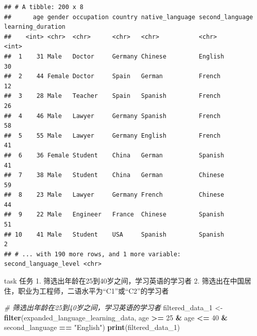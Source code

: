 \documentclass[]{book}
\newenvironment{Shaded}{\begin{snugshade}}{\end{snugshade}}
\newcommand{\CommentTok}[1]{\textcolor[rgb]{0.56,0.35,0.01}{\textit{#1}}}
\newcommand{\DecValTok}[1]{\textcolor[rgb]{0.00,0.00,0.81}{#1}}
\newcommand{\KeywordTok}[1]{\textcolor[rgb]{0.13,0.29,0.53}{\textbf{#1}}}
\newcommand{\NormalTok}[1]{#1}
\newcommand{\OperatorTok}[1]{\textcolor[rgb]{0.81,0.36,0.00}{\textbf{#1}}}
\newcommand{\StringTok}[1]{\textcolor[rgb]{0.31,0.60,0.02}{#1}}
\begin{document}
\begin{verbatim}
## # A tibble: 200 x 8
##      age gender occupation country native_language second_language learning_duration
##    <int> <chr>  <chr>      <chr>   <chr>           <chr>                       <int>
##  1    31 Male   Doctor     Germany Chinese         English                        30
##  2    44 Female Doctor     Spain   German          French                         12
##  3    28 Male   Teacher    Spain   Spanish         French                         26
##  4    46 Male   Lawyer     Germany Spanish         French                         58
##  5    55 Male   Lawyer     Germany English         French                         41
##  6    36 Female Student    China   German          Spanish                        41
##  7    38 Male   Student    China   German          Chinese                        59
##  8    23 Male   Lawyer     Germany French          Chinese                        44
##  9    22 Male   Engineer   France  Chinese         Spanish                        51
## 10    41 Male   Student    USA     Spanish         Spanish                         2
## # ... with 190 more rows, and 1 more variable: second_language_level <chr>
\end{verbatim}

\begin{infobox}task
任务
1. 筛选出年龄在25到40岁之间，学习英语的学习者
2. 筛选出在中国居住，职业为工程师，二语水平为``C1''或``C2''的学习者

\end{infobox}

\begin{Shaded}
\begin{Highlighting}[]
\CommentTok{# 筛选出年龄在25到40岁之间，学习英语的学习者}
\NormalTok{filtered_data_}\DecValTok{1}\NormalTok{ <-}\StringTok{ }\KeywordTok{filter}\NormalTok{(expanded_language_learning_data, age }\OperatorTok{>=}\StringTok{ }\DecValTok{25} \OperatorTok{&}\StringTok{ }\NormalTok{age }\OperatorTok{<=}\StringTok{ }\DecValTok{40} \OperatorTok{&}\StringTok{ }\NormalTok{second_language }\OperatorTok{==}\StringTok{ "English"}\NormalTok{)}
\KeywordTok{print}\NormalTok{(filtered_data_}\DecValTok{1}\NormalTok{)}
\end{Highlighting}
\end{Shaded}
\end{document}
